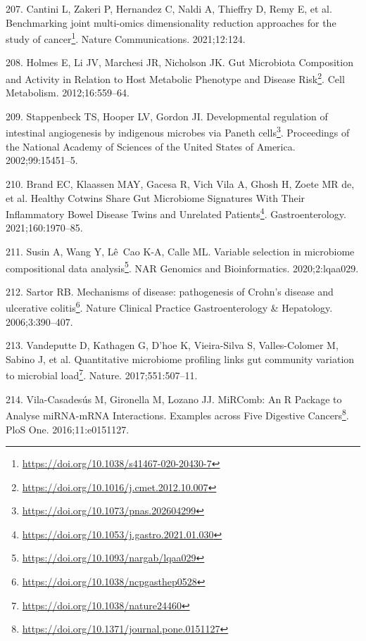 \documentclass[
  a4paper,
]{book}
\DeclareRobustCommand{\href}[2]{#2\footnote{\url{#1}}}
\newlength{\cslhangindent}
\newlength{\cslentryspacingunit} %
\newenvironment{CSLReferences}[2] %
 {%
  \setlength{\parindent}{0pt}
  \ifodd #1
  \let\oldpar\par
  \def\par{\hangindent=\cslhangindent\oldpar}
  \fi
  \setlength{\parskip}{#2\cslentryspacingunit}
 }%
 {}
\begin{document}
\begin{CSLReferences}{0}{0}
\leavevmode{}%
207. Cantini L, Zakeri P, Hernandez C, Naldi A, Thieffry D, Remy E, et al. \href{https://doi.org/10.1038/s41467-020-20430-7}{Benchmarking joint multi-omics dimensionality reduction approaches for the study of cancer}. Nature Communications. 2021;12:124.

\leavevmode{}%
208. Holmes E, Li JV, Marchesi JR, Nicholson JK. \href{https://doi.org/10.1016/j.cmet.2012.10.007}{Gut Microbiota Composition and Activity in Relation to Host Metabolic Phenotype and Disease Risk}. Cell Metabolism. 2012;16:559--64.

\leavevmode{}%
209. Stappenbeck TS, Hooper LV, Gordon JI. \href{https://doi.org/10.1073/pnas.202604299}{Developmental regulation of intestinal angiogenesis by indigenous microbes via Paneth cells}. Proceedings of the National Academy of Sciences of the United States of America. 2002;99:15451--5.

\leavevmode{}%
210. Brand EC, Klaassen MAY, Gacesa R, Vich Vila A, Ghosh H, Zoete MR de, et al. \href{https://doi.org/10.1053/j.gastro.2021.01.030}{Healthy Cotwins Share Gut Microbiome Signatures With Their Inflammatory Bowel Disease Twins and Unrelated Patients}. Gastroenterology. 2021;160:1970--85.

\leavevmode{}%
211. Susin A, Wang Y, Lê~Cao K-A, Calle ML. \href{https://doi.org/10.1093/nargab/lqaa029}{Variable selection in microbiome compositional data analysis}. NAR Genomics and Bioinformatics. 2020;2:lqaa029.

\leavevmode{}%
212. Sartor RB. \href{https://doi.org/10.1038/ncpgasthep0528}{Mechanisms of disease: pathogenesis of Crohn's disease and ulcerative colitis}. Nature Clinical Practice Gastroenterology \& Hepatology. 2006;3:390--407.

\leavevmode{}%
213. Vandeputte D, Kathagen G, D'hoe K, Vieira-Silva S, Valles-Colomer M, Sabino J, et al. \href{https://doi.org/10.1038/nature24460}{Quantitative microbiome profiling links gut community variation to microbial load}. Nature. 2017;551:507--11.

\leavevmode{}%
214. Vila-Casadesús M, Gironella M, Lozano JJ. \href{https://doi.org/10.1371/journal.pone.0151127}{MiRComb: An R Package to Analyse miRNA-mRNA Interactions. Examples across Five Digestive Cancers}. PloS One. 2016;11:e0151127.


\end{CSLReferences}
\end{document}
